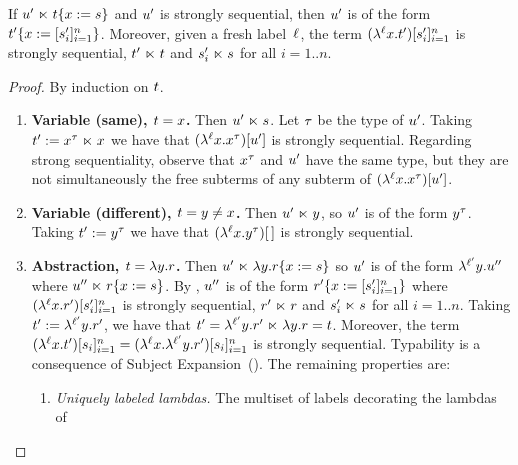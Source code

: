 \begin{lemma}
If $u' \mathrel{\ltimes} t\{x := s\}$
and $u'$ is strongly sequential,
then $u'$ is of the form $t'\{x := [s'_i]_{i=1}^n\}$.
Moreover, given a fresh label~$\ell$,
the term $(\lambda^{\ell} x. t')[s'_i]_{i=1}^{n}$ is strongly sequential,
$t' \mathrel{\ltimes} t$ and $s'_i \mathrel{\ltimes} s$ for all $i=1..n$.
\end{lemma}
\begin{proof}
By induction on $t$.
\begin{enumerate}
\item {\bf Variable (same), $t = x$.}
  Then $u' \mathrel{\ltimes} s$.
  Let $\tau$ be the type of $u'$.
  Taking $t' := x^\tau \mathrel{\ltimes} x$
  we have that $(\lambda^{\ell} x. x^\tau)[u']$ is strongly sequential.
  Regarding strong sequentiality,
  observe that $x^\tau$ and $u'$ have the same type, but they are not
  simultaneously the free subterms of any subterm of $(\lambda^{\ell} x. x^\tau)[u']$.
\item {\bf Variable (different), $t = y \neq x$.}
  Then $u' \mathrel{\ltimes} y$, so $u'$ is of the form $y^\tau$.
  Taking $t' := y^\tau$ we have that
  $(\lambda^{\ell} x. y^\tau)[\,]$ is strongly sequential.
\item {\bf Abstraction, $t = \lambda y. r$.}
  Then $u' \mathrel{\ltimes} \lambda y. r\{x := s\}$ 
  so $u'$ is of the form $\lambda^{\ell'} y. u''$
  where $u'' \mathrel{\ltimes} r\{x := s\}$.
  By \ih, $u''$ is of the form $r'\{x := [s'_i]_{i=1}^{n}\}$
  where $(\lambda^{\ell} x. r')[s'_i]_{i=1}^{n}$ is strongly sequential,
  $r' \mathrel{\ltimes} r$ and $s'_i \mathrel{\ltimes} s$ for all $i=1..n$.
  Taking $t' := \lambda^{\ell'} y. r'$,
  we have that
  $t' = \lambda^{\ell'} y. r' \mathrel{\ltimes} \lambda y. r = t$.
  Moreover, the term
  $(\lambda^{\ell} x. t')[s_i]_{i=1}^{n}
   = (\lambda^{\ell} x. \lambda^{\ell'} y. r')[s_i]_{i=1}^{n}$
  is strongly sequential.
  Typability is a consequence of Subject Expansion~().
  The remaining properties are:
  \begin{enumerate}
  \item {\em Uniquely labeled lambdas.}
    The multiset of labels decorating the lambdas of

\end{enumerate}
\end{enumerate}
\end{proof}
